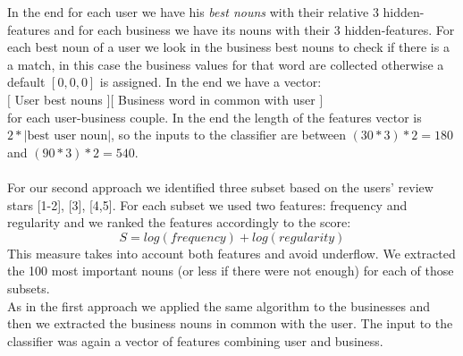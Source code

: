 \documentclass[11pt]{article}
\begin{document}
In the end for each user we have his\textit{ best nouns} with their relative 3 hidden-features and for each business we have its nouns with their 3 hidden-features. For each best noun of a user we look in the business best nouns to check if there is a a match, in this case the business values for that word are collected otherwise a default $[0,0,0]$ is assigned.
In the end we have a vector:\\
$[$ User best nouns $]  [$ Business word in common with user $]$\\
for each user-business couple.
In the end the length of the features vector is $2 * |\text{best user noun}|$, so the inputs to the classifier are between $(30*3)*2=180$ and $(90*3)*2=540$.\\\\
For our second approach we identified three subset based on the users' review stars [1-2], [3], [4,5]. For each subset we used two features: frequency and regularity and we ranked the features accordingly to the score:\[ S=log(frequency)+log(regularity) \]
This measure takes into account both features and avoid underflow.
We extracted the 100 most important nouns (or less if there were not enough) for each of those subsets.\\
As in the first approach we applied the same algorithm to the businesses and then we extracted the business nouns in common with the user. The input to the classifier was again a vector of features combining user and business.\\
\end{document}
